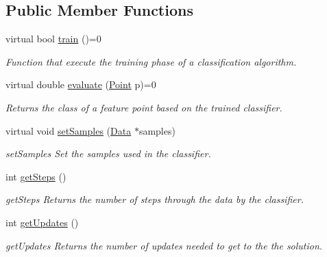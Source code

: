 \subsection*{Public Member Functions}
\begin{DoxyCompactItemize}
\item 
virtual bool \hyperlink{class_classifier_a2306a5de27555ab093593ac9642bc7d9}{train} ()=0
\begin{DoxyCompactList}\small\item\em Function that execute the training phase of a classification algorithm. \end{DoxyCompactList}\item 
virtual double \hyperlink{class_classifier_ae8e9554823b85ddc2dcad2955da811d9}{evaluate} (\hyperlink{class_point}{Point} p)=0
\begin{DoxyCompactList}\small\item\em Returns the class of a feature point based on the trained classifier. \end{DoxyCompactList}\item 
virtual void \hyperlink{class_classifier_a4b16736670cba8f4c8397b6a90c8c799}{set\+Samples} (\hyperlink{class_data}{Data} $\ast$samples)
\begin{DoxyCompactList}\small\item\em set\+Samples Set the samples used in the classifier. \end{DoxyCompactList}\item 
int \hyperlink{class_classifier_a1fb3e4dfd80c154e89603c8fa1b11b76}{get\+Steps} ()
\begin{DoxyCompactList}\small\item\em get\+Steps Returns the number of steps through the data by the classifier. \end{DoxyCompactList}\item 
int \hyperlink{class_classifier_a738c2fbed982db6cad02062edcc037e4}{get\+Updates} ()
\begin{DoxyCompactList}\small\item\em get\+Updates Returns the number of updates needed to get to the the solution. \end{DoxyCompactList}\end{DoxyCompactItemize}
